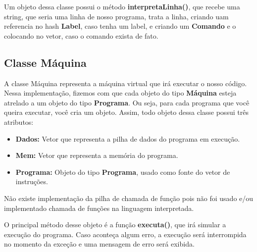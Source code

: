 \documentclass[11pt]{article}
\begin{document}
Um objeto dessa classe possui o método \textbf{{\color{red}interpretaLinha}()}, que recebe uma string, que seria uma linha de nosso programa, trata a linha, criando uam referencia no hash \textbf{Label}, caso tenha um label, e criando um \textbf{Comando} e o colocando no vetor, caso o comando exista de fato.


\subsection{Classe Máquina}

A classe Máquina representa a máquina virtual que irá executar o nosso código. Nessa implementação, fizemos com que cada objeto do tipo \textbf{\color{red}Máquina} esteja atrelado a um objeto do tipo \textbf{\color{red}Programa}. Ou seja, para cada programa que você queira executar, você cria um objeto. Assim, todo objeto dessa classe possui três atributos:

\begin{itemize}

\item \textbf{Dados:} Vetor que representa a pilha de dados do programa em execução.

\item \textbf{Mem:} Vetor que representa a memória do programa.

\item \textbf{Programa:} Objeto do tipo \textbf{\color{red}Programa}, usado como fonte do vetor de instruções.



\end{itemize}

Não existe implementação da pilha de chamada de função pois não foi usado e/ou implementado chamada de funções na linguagem interpretada.

O principal método desse objeto é a função \textbf{\color{red}executa()}, que irá simular a execução do programa. Caso aconteça algum erro, a execução será interrompida no momento da exceção e uma mensagem de erro será exibida.
\end{document}
